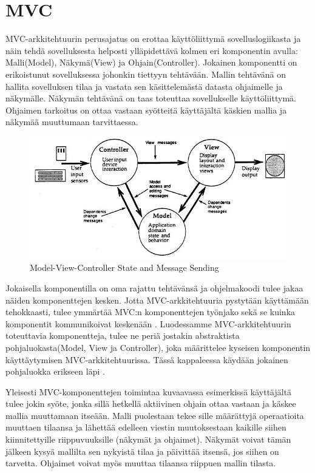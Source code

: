 \documentclass[finnish,utf8,nonumbib,palatino,kandi]{gradu2}
\begin{document}
\section {MVC}
MVC-arkkitehtuurin perusajatus on erottaa käyttöliittymä sovelluslogiikasta ja 
näin tehdä sovelluksesta helposti ylläpidettävä kolmen eri komponentin avulla: 
Malli(Model), Näkymä(View) ja Ohjain(Controller). Jokainen komponentti on 
erikoistunut sovelluksessa johonkin tiettyyn tehtävään. Mallin tehtävänä on 
hallita sovelluksen tilaa ja vastata sen käsittelemästä datasta ohjaimelle ja näkymälle.
Näkymän tehtävänä on taas toteuttaa sovellukselle käyttöliittymä. Ohjaimen tarkoitus on ottaa
vastaan syötteitä käyttäjältä käskien mallia ja näkymää muuttumaan tarvittaessa.  

\begin{figure}[h]
\centering
\includegraphics[scale=0.85]{krasner_mvc.jpg}
\caption{Model-View-Controller State and Message Sending \cite{Krasner:desc}}
\end{figure}

Jokaisella komponentilla on oma rajattu tehtävänsä ja ohjelmakoodi tulee jakaa näiden komponenttejen kesken. Jotta MVC-arkkitehtuuria pystytään käyttämään 
tehokkaasti, tulee ymmärtää MVC:n komponenttejen työnjako sekä se kuinka komponentit kommunikoivat keskenään \cite{Burbeck}.  Luodessamme MVC-arkkitehtuurin
toteuttavia komponentteja, tulee ne periä jostakin abstraktista pohjaluokasta(Model, View ja Controller), joka määrittelee kyseisen komponentin käyttäytymisen MVC-arkkitehtuurissa.  Tässä kappaleessa käydään jokainen pohjaluokka erikseen läpi \cite{Krasner:desc}. 

Yleisesti MVC-komponenttejen toimintaa kuvaavassa esimerkissä käyttäjältä tulee jokin syöte, jonka sillä hetkellä aktiivinen ohjain ottaa vastaan ja käskee mallia muuttamaan itseään. Malli puolestaan
tekee sille määrättyjä operaatioita muuttaen tilaansa ja lähettää edelleen viestin muutoksestaan kaikille siihen kiinnitettyille riippuvuuksille (näkymät ja ohjaimet). Näkymät
voivat tämän jälkeen kysyä mallilta sen nykyistä tilaa ja päivittää itsensä, jos siihen on tarvetta. Ohjaimet voivat myös muuttaa tilaansa riippuen mallin tilasta. \cite{Krasner:desc}
\end{document}
